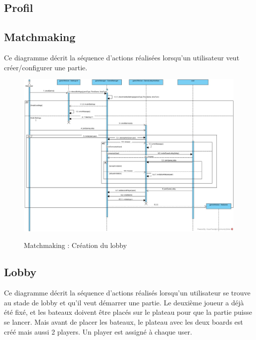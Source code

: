 \documentclass[../design_fonctionnement_sys.tex]{subfiles}
\begin{document}
\subsection{Profil}

\subsection{Matchmaking}
Ce diagramme décrit la séquence d'actions réalisées lorsqu'un utilisateur veut créer/configurer une partie.

\begin{figure}[H]
    \centering
    \includegraphics[scale=0.3]{img_design/PreLoby.jpg}
    \label{fig:seq_match_client}
    \caption{Matchmaking : Création du lobby}
\end{figure}

\newpage

\subsection{Lobby}
Ce diagramme décrit la séquence d'actions réalisés lorsqu'un utilisateur se trouve au stade de lobby et qu'il veut démarrer une partie.
Le deuxième joueur a déjà été fixé, et les bateaux doivent être placés sur le plateau pour que la partie puisse se lancer.
Mais avant de placer les bateaux, le plateau avec les deux boards est créé mais aussi 2 players. Un player est assigné à chaque user.
\end{document}
